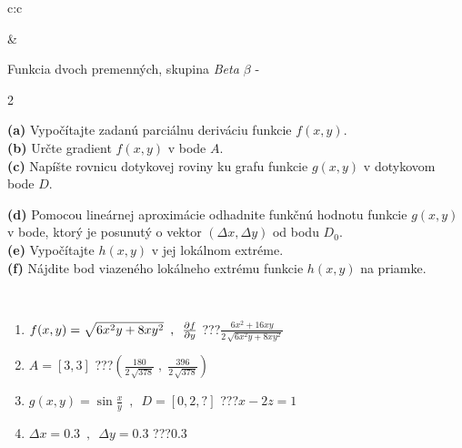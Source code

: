 \documentclass[10pt]{report}
\begin{document}
\begin{tabular}{c:c}
\begin{minipage}[c][104.5mm][t]{0.5\linewidth}
\begin{center}
\end{center}
\end{minipage}
&
\begin{minipage}[c][104.5mm][t]{0.5\linewidth}
\begin{center}
\vspace{7mm}
{\huge \LARGE Funkcia dvoch premenných, skupina \textit{Beta $\beta$} -}\\[5mm]
\begin{minipage}{0.95\linewidth}
\begin{center}
{\small \begin{multicols}{2} \raggedright
\textbf{(a)} Vypočítajte zadanú parciálnu deriváciu funkcie \(f(x,y)\). \\[1mm]
\textbf{(b)} Určte gradient \(f(x,y)\) v bode \(A\). \\[1mm]
\textbf{(c)} Napíšte rovnicu dotykovej roviny ku grafu funkcie \(g(x,y)\) v dotykovom bode \(D\). \par \columnbreak
\textbf{(d)} Pomocou lineárnej aproximácie odhadnite funkčnú hodnotu funkcie \(g(x,y)\) v bode, ktorý je posunutý o vektor \((\Delta x, \Delta y)\) od bodu \(D_0\). \\[1mm]
\textbf{(e)} Vypočítajte \(h(x,y)\) v jej lokálnom extréme. \\[1mm]
\textbf{(f)} Nájdite bod viazeného lokálneho extrému funkcie \(h(x,y)\) na priamke. \\[1mm]
\end{multicols}
}
\end{center}
\end{minipage}
\\[4mm]
\begin{minipage}{0.79\linewidth}
\begin{center}
\begin{varwidth}{\linewidth}
\begin{enumerate}
\normalsizerr
\item $f(x,y) = \sqrt{6x^2y + 8xy^2}\enspace , \enspace \pdv{f}{y}$\quad \dotfill\; ???\;\dotfill \quad $\frac{6x^2+16xy}{2\,\sqrt{6x^2y+8xy^2}}$
\item $A = [3, 3]$\quad \dotfill\; ???\;\dotfill \quad $\left( \frac{180}{2\,\sqrt{378}} \;,\; \frac{396}{2\,\sqrt{378}} \right)$
\item $g(x,y) = \sin\frac{x}{y} \enspace , \enspace D = [0, 2, ?]$\quad \dotfill\; ???\;\dotfill \quad $x-2z=1$
\item $\Delta x = {0.3} \enspace,\enspace \Delta y = {0.3}$\quad \dotfill\; ???\;\dotfill \quad $0.3$

\end{enumerate}
\end{varwidth}
\end{center}
\end{minipage}
\end{center}
\end{minipage}
\end{tabular}
\end{document}
